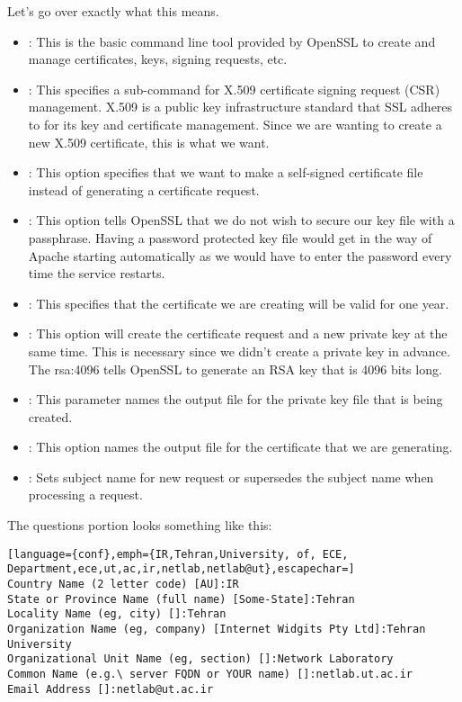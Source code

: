 \documentclass{../UTNetLab}
\begin{document}
        Let's go over exactly what this means.

        \begin{itemize}
            \item {}: This is the basic command line tool provided by OpenSSL to create and manage certificates, keys, signing requests, etc.
            \item {}: This specifies a sub-command for X.509 certificate signing request (CSR) management.
                X.509 is a public key infrastructure standard that SSL adheres to for its key and certificate management.
                Since we are wanting to create a new X.509 certificate, this is what we want.
            \item {}: This option specifies that we want to make a self-signed certificate file instead of generating a certificate request.
            \item {}: This option tells OpenSSL that we do not wish to secure our key file with a passphrase.
                Having a password protected key file would get in the way of Apache starting automatically as we would have to enter the password every time the service restarts.
            \item {}: This specifies that the certificate we are creating will be valid for one year.
            \item {}: This option will create the certificate request and a new private key at the same time.
                This is necessary since we didn't create a private key in advance.
                The rsa:4096 tells OpenSSL to generate an RSA key that is 4096 bits long.
            \item {}: This parameter names the output file for the private key file that is being created.
            \item {}: This option names the output file for the certificate that we are generating.
            \item {}: Sets subject name for new request or supersedes the subject name when processing a request.
        \end{itemize}

    The questions portion looks something like this:
    {\small
    \begin{lstlisting}[language={conf},emph={IR,Tehran,University, of, ECE, Department,ece,ut,ac,ir,netlab,netlab@ut},escapechar=]
Country Name (2 letter code) [AU]:IR 
State or Province Name (full name) [Some-State]:Tehran 
Locality Name (eg, city) []:Tehran 
Organization Name (eg, company) [Internet Widgits Pty Ltd]:Tehran University 
Organizational Unit Name (eg, section) []:Network Laboratory 
Common Name (e.g.\ server FQDN or YOUR name) []:netlab.ut.ac.ir
Email Address []:netlab@ut.ac.ir
    \end{lstlisting}}
\end{document}
